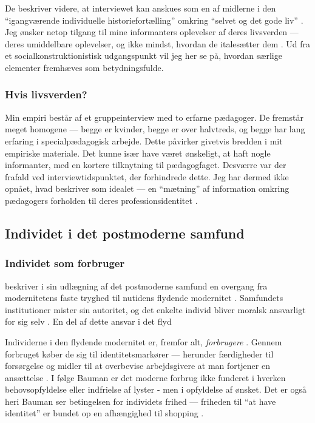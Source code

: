 De beskriver videre, at interviewet kan anskues som en af midlerne i den “igangværende individuelle historiefortælling” omkring “selvet og det gode liv” \autocite[s. 30]{tanggaardInterviewetSamtalenSom2015}.
Jeg ønsker netop tilgang til mine informanters oplevelser af deres livsverden — deres umiddelbare oplevelser, og ikke mindst, hvordan de italesætter dem \autocite[s. 31]{tanggaardInterviewetSamtalenSom2015}.
Ud fra et socialkonstruktionistisk udgangspunkt vil jeg her se på, hvordan særlige elementer fremhæves som betydningsfulde.

\subsubsection{Hvis livsverden?}
Min empiri består af et gruppeinterview med to erfarne pædagoger.
De fremstår meget homogene — begge er kvinder, begge er over halvtreds, og begge har lang erfaring i specialpædagogisk arbejde.
Dette påvirker givetvis bredden i mit empiriske materiale.
Det kunne især have været ønskeligt, at haft nogle informanter, med en kortere tilknytning til pædagogfaget.
Desværre var der frafald ved interviewtidspunktet, der forhindrede dette.
Jeg har dermed ikke opnået, hvad \autocite{tanggaardInterviewetSamtalenSom2015} beskriver som idealet — en “mætning” af information omkring pædagogers forholden til deres professionsidentitet \autocite[s. 32]{tanggaardInterviewetSamtalenSom2015}.

\subsection{Individet i det postmoderne samfund}

\subsubsection{Individet som forbruger}
\citeauthor{baumanLiquidModernity2000} beskriver i sin udlægning af det postmoderne samfund en overgang fra modernitetens faste tryghed til nutidens flydende modernitet \autocite[s. 2]{baumanLiquidModernity2000}.
Samfundets institutioner mister sin autoritet, og det enkelte individ bliver moralsk ansvarligt for sig selv \autocite[s. 64ff]{baumanLiquidModernity2000}.
En del af dette ansvar i det flyd

Individerne i den flydende modernitet er, fremfor alt, \textit{forbrugere} \autocite[s 73ff; s. 76]{baumanLiquidModernity2000}.
Gennem forbruget køber de sig til identitetsmarkører --- herunder færdigheder til forsørgelse og midler til at overbevise arbejdsgivere at man fortjener en ansættelse \autocite[s. 74]{baumanLiquidModernity2000}.
I følge Bauman er det moderne forbrug ikke funderet i hverken behovsopfyldelse eller indfrielse af lyster - men i opfyldelse af ønsket.
Det er også heri Bauman ser betingelsen for individets frihed --- friheden til “at have identitet” er bundet op en afhængighed til shopping \autocite[s. 84]{baumanLiquidModernity2000}.

